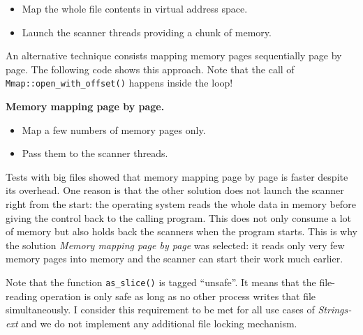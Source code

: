 \begin{itemize}
\item
  Map the whole file contents in virtual address space.
\item
  Launch the scanner threads providing a chunk of memory.
\end{itemize}

An alternative technique consists mapping memory pages sequentially page
by page. The following code shows this approach. Note that the call of
\texttt{Mmap::open\_with\_offset()} happens inside the loop!

\textbf{Memory mapping page by page.}

\begin{Shaded}
\begin{Highlighting}[]
  \NormalTok{;}
   \NormalTok{= }\NormalTok{;}
 
     
      
\NormalTok{\}}
\end{Highlighting}
\end{Shaded}

\begin{itemize}
\item
  Map a few numbers of memory pages only.
\item
  Pass them to the scanner threads.
\end{itemize}

Tests with big files showed that memory mapping page by page is faster
despite its overhead. One reason is that the other solution does not
launch the scanner right from the start: the operating system reads the
whole data in memory before giving the control back to the calling
program. This does not only consume a lot of memory but also holds back
the scanners when the program starts. This is why the solution
\emph{Memory mapping page by page} was selected: it reads only very few
memory pages into memory and the scanner can start their work much
earlier.

Note that the function \texttt{as\_slice()} is tagged ``unsafe''. It
means that the file-reading operation is only safe as long as no other
process writes that file simultaneously. I consider this requirement to
be met for all use cases of \emph{Strings­ext} and we do not implement
any additional file locking mechanism.

